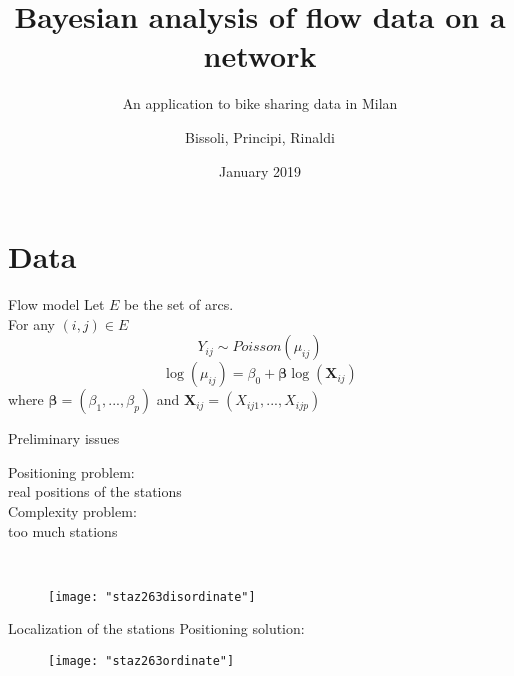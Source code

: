 \documentclass[pdf]{beamer}
\title{Bayesian analysis of flow data on a network}
\subtitle{An application to bike sharing data in Milan}
\author{Bissoli, Principi, Rinaldi}
\date{January 2019}
\begin{document}
	
\begin{frame}
	\titlepage
\end{frame}

\section{Data}

\begin{frame}{Flow model}
Let $E$ be the set of arcs.\\[0.2cm]
For any $(i,j) \in E$
\[Y_{ij} \sim Poisson(\mu_{ij})\]
\[\log(\mu_{ij}) = \beta_0 + \mathbf{\beta} \log(\mathbf{X}_{ij})\]
where  $\mathbf{\beta}=(\beta_1,...,\beta_p)$ and $\mathbf{X}_{ij}=(X_{ij1},...,X_{ijp})$
    
\end{frame}

\begin{frame}{Preliminary issues}
\begin{minipage}{0.45\textwidth}
Positioning problem:\\[0.1cm] real positions of the stations\\[0.5cm]
Complexity problem:\\[0.1cm] too much stations
\end{minipage}
~
\begin{minipage}{0.45\textwidth}
    \begin{figure}
	\centering
	\texttt{[image: "staz263disordinate"]}
	\label{fig:bikesianmibellissimo-s-e-a-modificate}
    \end{figure}
\end{minipage}

\end{frame}

\begin{frame}{Localization of the stations}
\centering Positioning solution:\\[0.1cm]
\begin{figure}
	\centering
	\texttt{[image: "staz263ordinate"]}
	\label{fig:bikesianmibellissimo-s-e-a-modificate}
\end{figure}
\end{frame}
\end{document}
